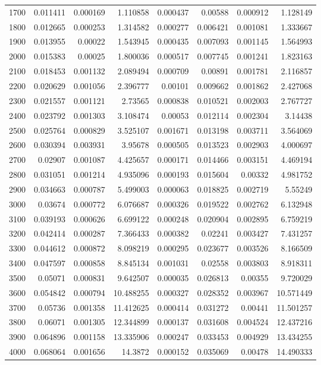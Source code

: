 \begin{tabular}{r r r r r r r r}
1700 & 0.011411 & 0.000169 & 1.110858 & 0.000437 & 0.00588 & 0.000912 & 1.128149 \\
1800 & 0.012665 & 0.000253 & 1.314582 & 0.000277 & 0.006421 & 0.001081 & 1.333667 \\
1900 & 0.013955 & 0.00022 & 1.543945 & 0.000435 & 0.007093 & 0.001145 & 1.564993 \\
2000 & 0.015383 & 0.00025 & 1.800036 & 0.000517 & 0.007745 & 0.001241 & 1.823163 \\
2100 & 0.018453 & 0.001132 & 2.089494 & 0.000709 & 0.00891 & 0.001781 & 2.116857 \\
2200 & 0.020629 & 0.001056 & 2.396777 & 0.00101 & 0.009662 & 0.001862 & 2.427068 \\
2300 & 0.021557 & 0.001121 & 2.73565 & 0.000838 & 0.010521 & 0.002003 & 2.767727 \\
2400 & 0.023792 & 0.001303 & 3.108474 & 0.00053 & 0.012114 & 0.002304 & 3.14438 \\
2500 & 0.025764 & 0.000829 & 3.525107 & 0.001671 & 0.013198 & 0.003711 & 3.564069 \\
2600 & 0.030394 & 0.003931 & 3.95678 & 0.000505 & 0.013523 & 0.002903 & 4.000697 \\
2700 & 0.02907 & 0.001087 & 4.425657 & 0.000171 & 0.014466 & 0.003151 & 4.469194 \\
2800 & 0.031051 & 0.001214 & 4.935096 & 0.000193 & 0.015604 & 0.00332 & 4.981752 \\
2900 & 0.034663 & 0.000787 & 5.499003 & 0.000063 & 0.018825 & 0.002719 & 5.55249 \\
3000 & 0.03674 & 0.000772 & 6.076687 & 0.000326 & 0.019522 & 0.002762 & 6.132948 \\
3100 & 0.039193 & 0.000626 & 6.699122 & 0.000248 & 0.020904 & 0.002895 & 6.759219 \\
3200 & 0.042414 & 0.000287 & 7.366433 & 0.000382 & 0.02241 & 0.003427 & 7.431257 \\
3300 & 0.044612 & 0.000872 & 8.098219 & 0.000295 & 0.023677 & 0.003526 & 8.166509 \\
3400 & 0.047597 & 0.000858 & 8.845134 & 0.001031 & 0.02558 & 0.003803 & 8.918311 \\
3500 & 0.05071 & 0.000831 & 9.642507 & 0.000035 & 0.026813 & 0.00355 & 9.720029 \\
3600 & 0.054842 & 0.000794 & 10.488255 & 0.000327 & 0.028352 & 0.003967 & 10.571449 \\
3700 & 0.05736 & 0.001358 & 11.412625 & 0.000414 & 0.031272 & 0.00441 & 11.501257 \\
3800 & 0.06071 & 0.001305 & 12.344899 & 0.000137 & 0.031608 & 0.004524 & 12.437216 \\
3900 & 0.064896 & 0.001158 & 13.335906 & 0.000247 & 0.033453 & 0.004929 & 13.434255 \\
4000 & 0.068064 & 0.001656 & 14.3872 & 0.000152 & 0.035069 & 0.00478 & 14.490333 \\
\end{tabular}


